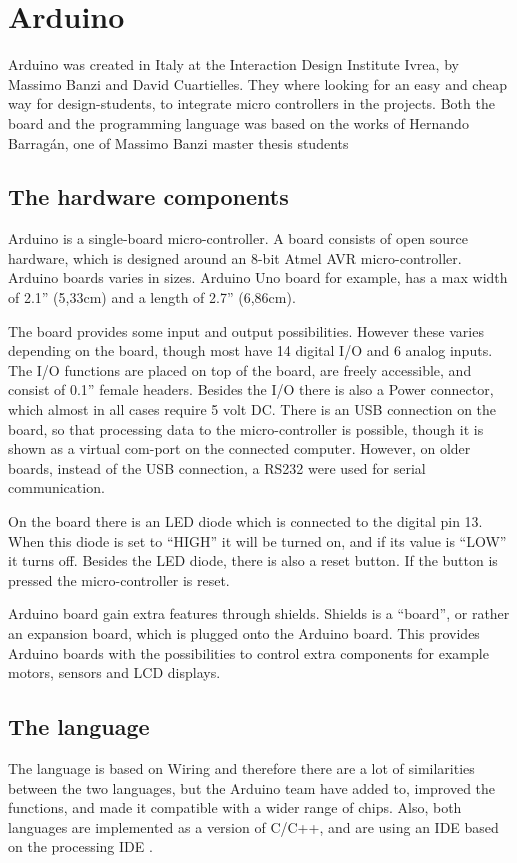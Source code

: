 \chapter{Arduino}\label{analysis:arduino}
Arduino was created in Italy at the Interaction Design Institute Ivrea, by Massimo Banzi and David Cuartielles. They where looking for an easy and cheap way for design-students, to integrate micro controllers in the projects\cite{arduino:hist}. Both the board and the programming language was based on the works of Hernando Barragán, one of Massimo Banzi master thesis students \cite{Wiring:thesis}

\section{The hardware components}
Arduino is a single-board micro-controller.
A board consists of open source hardware, which is designed around an 8-bit Atmel AVR micro-controller. Arduino boards varies in sizes. Arduino Uno board for example, has a max width of 2.1'' (5,33cm) and a length of 2.7'' (6,86cm). 

The board provides some input and output possibilities. However these varies depending on the board, though most have 14 digital I/O and 6 analog inputs. The I/O functions are placed on top of the board, are freely accessible, and consist of 0.1'' female headers. Besides the I/O there is also a Power connector, which almost in all cases require 5 volt DC. There is an USB connection on the board, so that processing data to the micro-controller is possible, though it is shown as a virtual com-port on the connected computer. However, on older boards, instead of the USB connection, a RS232 were used for serial communication. 

On the board there is an LED diode which is connected to the digital pin 13. When this diode is set to ``HIGH'' it will be turned on, and if its value is ``LOW'' it turns off. Besides the LED diode, there is also a reset button. If the button is pressed the micro-controller is reset. 

Arduino board gain extra features through shields. Shields is a ``board'', or rather an expansion board, which is plugged onto the Arduino board. This provides Arduino boards with the possibilities to control extra components for example motors, sensors and LCD displays.

\section{The language}
The language is based on Wiring and therefore there are a lot of similarities between the two languages, but the Arduino team have added to, improved the functions, and made it compatible with a wider range of chips. Also, both languages are implemented as a  version of C/C++, and are using an IDE based on the processing IDE \cite{Wiring:thesis}\cite{Arduino:IDE}.\\

